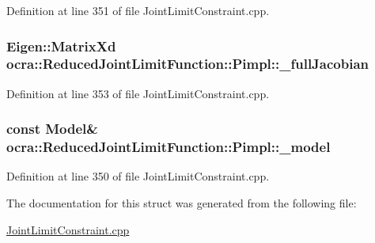 Definition at line 351 of file Joint\+Limit\+Constraint.\+cpp.

\subsubsection[{\texorpdfstring{\+\_\+full\+Jacobian}{_fullJacobian}}]{\setlength{\rightskip}{0pt plus 5cm}Eigen\+::\+Matrix\+Xd ocra\+::\+Reduced\+Joint\+Limit\+Function\+::\+Pimpl\+::\+\_\+full\+Jacobian}\hypertarget{structReducedJointLimitFunction_1_1Pimpl_ae45e80b72fb13b54452c6ce9fe9e3798}{}\label{structReducedJointLimitFunction_1_1Pimpl_ae45e80b72fb13b54452c6ce9fe9e3798}


Definition at line 353 of file Joint\+Limit\+Constraint.\+cpp.

\subsubsection[{\texorpdfstring{\+\_\+model}{_model}}]{\setlength{\rightskip}{0pt plus 5cm}const {\bf Model}\& ocra\+::\+Reduced\+Joint\+Limit\+Function\+::\+Pimpl\+::\+\_\+model}\hypertarget{structReducedJointLimitFunction_1_1Pimpl_abe6f625fec9bf8cff9f847bde9eb9ee2}{}\label{structReducedJointLimitFunction_1_1Pimpl_abe6f625fec9bf8cff9f847bde9eb9ee2}


Definition at line 350 of file Joint\+Limit\+Constraint.\+cpp.



The documentation for this struct was generated from the following file\+:\begin{DoxyCompactItemize}
\item 
\hyperlink{JointLimitConstraint_8cpp}{Joint\+Limit\+Constraint.\+cpp}\end{DoxyCompactItemize}
